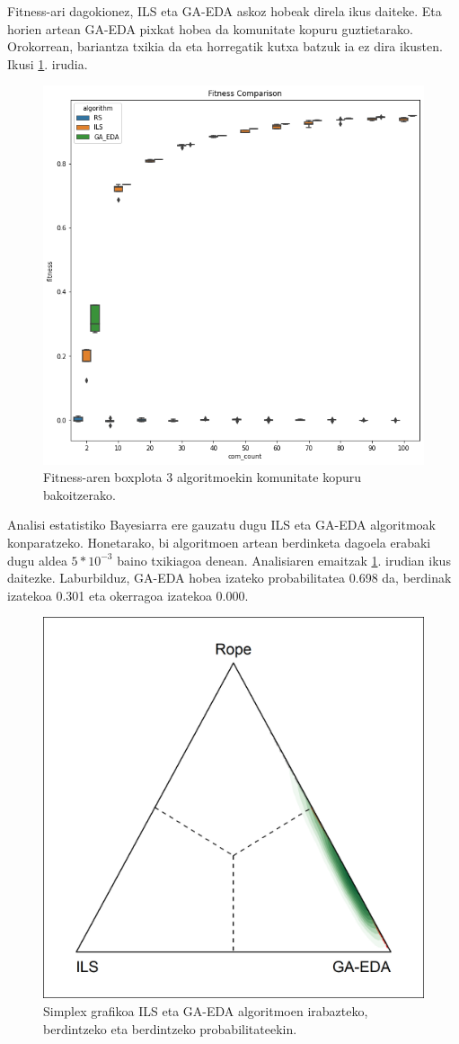 \documentclass[sigconf]{acmart}
\begin{document}
Fitness-ari dagokionez, ILS eta GA-EDA askoz hobeak direla ikus daiteke. Eta horien artean GA-EDA pixkat hobea da komunitate kopuru guztietarako. Orokorrean, bariantza txikia da eta horregatik kutxa batzuk ia ez dira ikusten. Ikusi \ref{fig:boxplot_fitness}. irudia.

\begin{figure}
    \centering
    \includegraphics[width=1\linewidth]{boxplot_fitness}
    \caption{Fitness-aren boxplota 3 algoritmoekin komunitate kopuru bakoitzerako.}
    \label{fig:boxplot_fitness}
\end{figure}

Analisi estatistiko Bayesiarra ere gauzatu dugu ILS eta GA-EDA algoritmoak konparatzeko. Honetarako, bi algoritmoen artean berdinketa dagoela erabaki dugu aldea $5*10^{-3}$ baino txikiagoa denean. Analisiaren emaitzak \ref{fig:boxplot_fitness}. irudian ikus daitezke. Laburbilduz, GA-EDA hobea izateko probabilitatea 0.698 da, berdinak izatekoa 0.301 eta okerragoa izatekoa 0.000.

\begin{figure}
    \centering
    \includegraphics[width=0.5\linewidth]{simplex}
    \caption{Simplex grafikoa ILS eta GA-EDA algoritmoen irabazteko, berdintzeko eta berdintzeko probabilitateekin.}
    \label{fig:simplex}
\end{figure}
\end{document}
